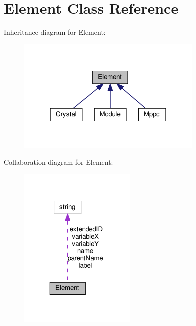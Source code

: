 \hypertarget{classElement}{\section{Element Class Reference}
\label{classElement}
}


Inheritance diagram for Element\+:
\nopagebreak
\begin{figure}[H]
\begin{center}
\leavevmode
\includegraphics[width=253pt]{classElement__inherit__graph}
\end{center}
\end{figure}


Collaboration diagram for Element\+:
\nopagebreak
\begin{figure}[H]
\begin{center}
\leavevmode
\includegraphics[width=160pt]{classElement__coll__graph}
\end{center}
\end{figure}
